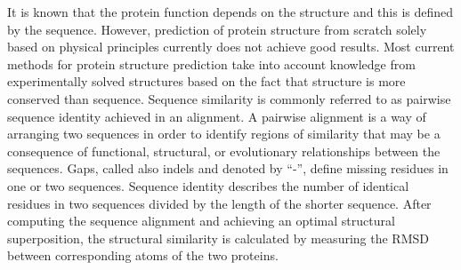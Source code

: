 It is known that the protein function depends on the structure and this is defined by the sequence. However, prediction of protein structure from scratch solely based on physical principles currently does not achieve good results. Most current methods for protein structure prediction take into account knowledge from experimentally solved structures based on the fact that structure is more conserved than sequence.
Sequence similarity is commonly referred to as pairwise sequence identity achieved in an alignment. A pairwise alignment is a way of arranging two sequences in order to identify regions of similarity that may be a consequence of functional, structural, or evolutionary relationships between the sequences. Gaps, called also indels and denoted by ``-'', define missing residues in one or two sequences. Sequence identity describes the number of identical residues in two sequences divided by the length of the shorter sequence. After computing the sequence alignment and achieving an optimal structural superposition, the structural similarity is calculated by measuring the \gls{RMSD} between corresponding atoms of the two proteins.


